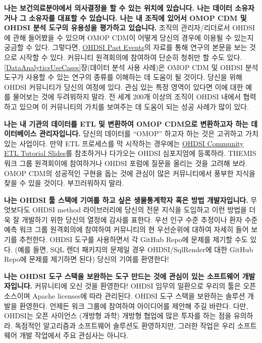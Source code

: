 \documentclass[11pt]{book}
\theoremstyle{definition}
\theoremstyle{definition}
\theoremstyle{definition}
\theoremstyle{remark}
\begin{document}
\textbf{나는 보건의료분야에서 의사결정을 할 수 있는 위치에 있습니다.
나는 데이터 소유자거나 그 소유자를 대표할 수 있습니다. 나는 내 조직에
있어서 OMOP CDM 및 OHDSI 분석 도구의 유용성을 평가하고 있습니다.} 조직의
관리자/리더로서 OHDSI에 관해 들어봤을 수 있으며 OMOP CDM이 어떻게 당신의
경우에 이용될 수 있는지 궁금할 수 있다. 그렇다면,
\href{https://www.ohdsi.org/past-events/}{OHDSI Past Events}의 자료를
통해 연구의 본문을 보는 것으로 시작할 수 있다. 커뮤니티 원격회의에
참여하여 단순히 청취만 할 수도 있다.
\ref{DataAnalyticsUseCases}장(데이터 분석 사용 사례)은 OMOP CDM 및 OHDSI
분석 도구가 사용할 수 있는 연구의 종류를 이해하는 데 도움이 될 것이다.
당신을 위해 OHDSI 커뮤니티가 당신의 여정에 있다. 관심 있는 특정 영역이
있다면 이에 대한 예를 물어보는 것에 두려워하지 말라. 전 세계 200개
이상의 조직이 OHDSI 내에서 협력하고 있으며 이 커뮤니티의 가치를 보여주는
데 도움이 되는 성공 사례가 많이 있다.

\textbf{나는 내 기관의 데이터를 ETL 및 변환하여 OMOP CDM으로 변환하고자
하는 데이터베이스 관리자입니다.} 당신의 데이터를 ``OMOP'' 하고자 하는
것은 고귀하고 가치 있는 사업이다. 만약 ETL 프로세스를 막 시작하는
경우에는
\href{https://www.ohdsi-europe.org/images/symposium-2019/tutorials/OHDSI_Vocabulary_CDM_Tutorial.pdf}{OHDSI
Community ETL Tutorial Slides}를 참조하거나 다가오는 OHDSI 심포지엄에
등록하라. THEMIS 워크 그룹 원격회이에 참여하거나 OHDSI 포럼에 질문을
올리는 것을 고려해 보라. OMOP CDM의 성공적인 구현을 돕는 것에 관심이
많은 커뮤니티에서 풍부한 지식을 찾을 수 있을 것이다. 부끄러워하지 말라.

\textbf{나는 OHDSI 툴 스택에 기여를 하고 싶은 생물통계학자 혹은 방법
개발자입니다.} 무엇보다도 OHDSI method 라이브러리에 당신의 전문 지식을
도입하고 이런 방법을 더욱 잘 개발하기 위한 당신의 열정에 감사를 표한다.
우선 인구 수준 추정이나 환자 수준 예측 워크 그룹 원격회의에 참여하여
커뮤니티의 현 우선순위에 대하여 자세히 들어 보기를 추천한다. OHDSI
도구를 사용하면서 각 GitHub Repo에 문제를 제기할 수도 있다. (예를 들면,
SQL 렌더 패키지의 문제일 경우 OHDSI/SqlRender에 대한 GitHub Repo에
문제를 제기하면 된다) 당신의 기여를 환영한다!

\textbf{나는 OHDSI 도구 스택을 보완하는 도구 만드는 것에 관심이 있는
소프트웨어 개발자입니다.} 커뮤니티에 오신 것을 환영한다! OHDSI 임무의
일환으로 우리의 툴은 오픈소스이며 Apache licenses에 따라 관리된다. OHDSI
도구 스택을 보완하는 솔루션 개발을 환영한다. 언제든 워크 그룹에 참여하여
아이디어를 제안해 주길 바란다. 다만, OHDSI는 오픈 사이언스 (개방형 과학)
개방형 협업에 많은 투자를 하는 점을 유의하라. 독점적인 알고리즘과
소프트웨어 솔루션도 환영하지만, 그러한 작업은 우리 소프트웨어 개발
작업에서 주요 관심사는 아니다.
\end{document}
